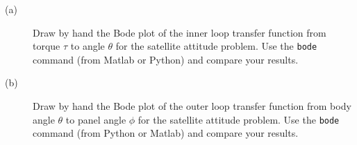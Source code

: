 
\begin{description}
\item[(a)] Draw by hand the Bode plot of the inner loop transfer function from torque $\tau$ to angle $\theta$ for the satellite attitude problem.
Use the \texttt{bode} command (from Matlab or Python) and compare your results.
\item[(b)] Draw by hand the Bode plot of the outer loop transfer function from body angle $\theta$ to panel angle $\phi$ for the satellite attitude problem.
Use the \texttt{bode} command (from Python or Matlab) and compare your results.
\end{description}